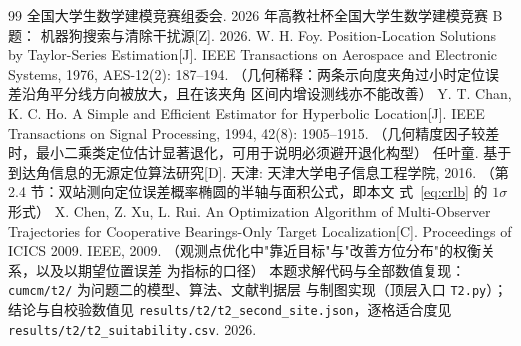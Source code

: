 
\begin{thebibliography}{99}
 全国大学生数学建模竞赛组委会. 2026 年高教社杯全国大学生数学建模竞赛 B 题：
                    机器狗搜索与清除干扰源[Z]. 2026.
 W. H. Foy. Position-Location Solutions by Taylor-Series Estimation[J].
                  IEEE Transactions on Aerospace and Electronic Systems, 1976, AES-12(2): 187--194.
                  （几何稀释：两条示向度夹角过小时定位误差沿角平分线方向被放大，且在该夹角
                  区间内增设测线亦不能改善）
 Y. T. Chan, K. C. Ho. A Simple and Efficient Estimator for Hyperbolic
                   Location[J]. IEEE Transactions on Signal Processing, 1994, 42(8): 1905--1915.
                   （几何精度因子较差时，最小二乘类定位估计显著退化，可用于说明必须避开退化构型）
 任叶童. 基于到达角信息的无源定位算法研究[D]. 天津: 天津大学电子信息工程学院,
                  2016. （第 2.4 节：双站测向定位误差概率椭圆的半轴与面积公式，即本文
                  式~\eqref{eq:crlb} 的 $1\sigma$ 形式）
 X. Chen, Z. Xu, L. Rui. An Optimization Algorithm of Multi-Observer
                   Trajectories for Cooperative Bearings-Only Target Localization[C].
                   Proceedings of ICICS 2009. IEEE, 2009.
                   （观测点优化中"靠近目标"与"改善方位分布"的权衡关系，以及以期望位置误差
                   为指标的口径）
 本题求解代码与全部数值复现：\texttt{cumcm/t2/} 为问题二的模型、算法、文献判据层
              与制图实现（顶层入口 \texttt{T2.py}）；结论与自校验数值见
              \texttt{results/t2/t2\_second\_site.json}，逐格适合度见
              \texttt{results/t2/t2\_suitability.csv}. 2026.
\end{thebibliography}
